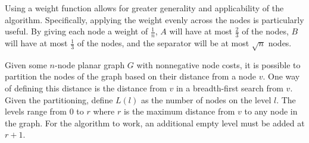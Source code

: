 \documentclass[11pt]{article}
\begin{document}
Using a weight function allows for greater generality and applicability of the algorithm. Specifically, applying the weight evenly across the nodes is particularly useful. By giving each node a weight of $\frac{1}{n}$, $A$ will have at most $\frac{2}{3}$ of the nodes, $B$ will have at most $\frac{1}{3}$ of the nodes, and the separator will be at most $\sqrt{n}$ nodes.

Given some $n$-node planar graph $G$ with nonnegative node costs, it is possible to partition the nodes of the graph based on their distance from a node $v$. One way of defining this distance is the distance from $v$ in a breadth-first search from $v$. Given the partitioning, define $L(l)$ as the number of nodes on the level $l$. The levels range from $0$ to $r$ where $r$ is the maximum distance from $v$ to any node in the graph. For the algorithm to work, an additional empty level must be added at $r+1$.
\end{document}
